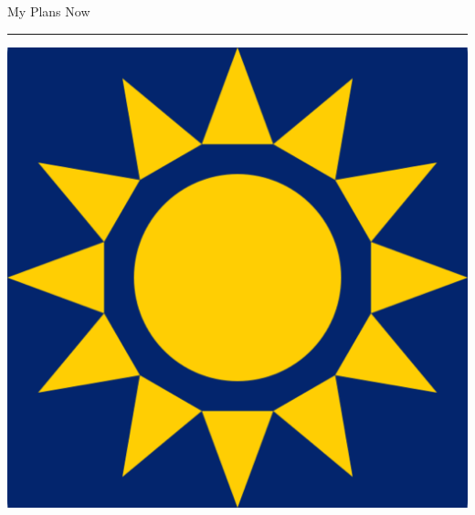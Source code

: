 \documentclass{beamer}
\begin{document}
\begin{frame}{My Plans Now}
\begin{center}
        \rule{\textwidth}{2pt}
        \vspace{5pt}

        \includegraphics[height=0.2\textheight]{static/pycon-namibia.png}

    \end{center}
\end{frame}
\end{document}

